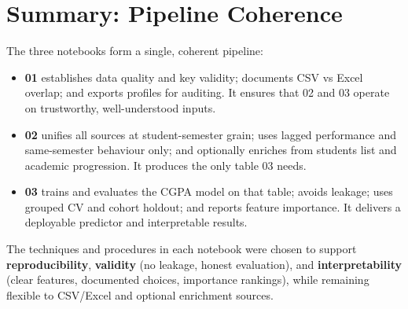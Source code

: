 \documentclass[12pt,a4paper]{article}
\begin{document}
\section{Summary: Pipeline Coherence}

The three notebooks form a single, coherent pipeline:

\begin{itemize}[leftmargin=*]
  \item \textbf{01} establishes data quality and key validity; documents CSV vs Excel overlap; and exports profiles for auditing. It ensures that 02 and 03 operate on trustworthy, well-understood inputs.
  \item \textbf{02} unifies all sources at student-semester grain; uses lagged performance and same-semester behaviour only; and optionally enriches from students list and academic progression. It produces the only table 03 needs.
  \item \textbf{03} trains and evaluates the CGPA model on that table; avoids leakage; uses grouped CV and cohort holdout; and reports feature importance. It delivers a deployable predictor and interpretable results.
\end{itemize}

The techniques and procedures in each notebook were chosen to support \textbf{reproducibility}, \textbf{validity} (no leakage, honest evaluation), and \textbf{interpretability} (clear features, documented choices, importance rankings), while remaining flexible to CSV/Excel and optional enrichment sources.
\end{document}
